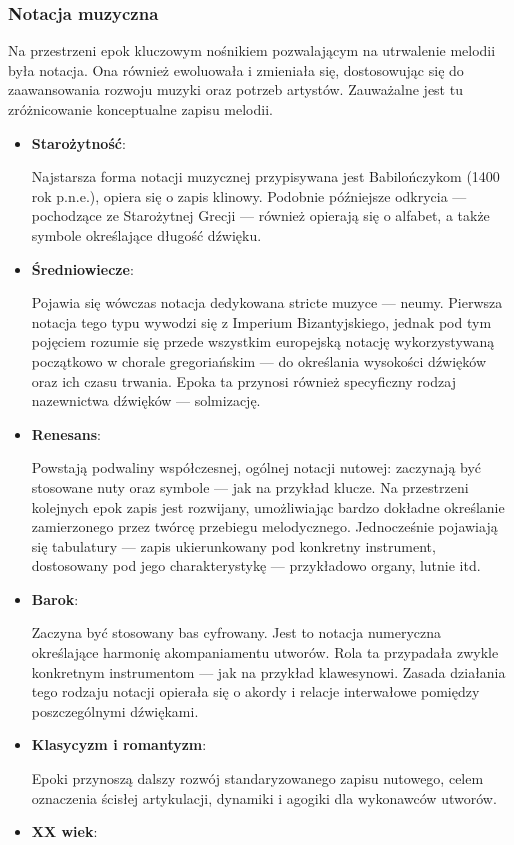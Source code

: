 \documentclass[12pt]{article}
\begin{document}
\subsubsection{Notacja muzyczna}
Na przestrzeni epok kluczowym nośnikiem pozwalającym na utrwalenie melodii była notacja.
Ona również ewoluowała i zmieniała się, dostosowując się do zaawansowania rozwoju muzyki oraz potrzeb artystów.
Zauważalne jest tu zróżnicowanie konceptualne zapisu melodii.
\begin{itemize}
	\item \textbf{Starożytność}:
	      
	      Najstarsza forma notacji muzycznej przypisywana jest Babilończykom (1400 rok p.n.e.), opiera się o zapis klinowy.
	      Podobnie późniejsze odkrycia — pochodzące ze Starożytnej Grecji — również opierają się o alfabet,
	      a także symbole określające długość dźwięku.
	\item \textbf{Średniowiecze}:
	      
	      Pojawia się wówczas notacja dedykowana stricte muzyce — neumy. Pierwsza notacja tego typu wywodzi się z Imperium Bizantyjskiego,
	      jednak pod tym pojęciem rozumie się przede wszystkim europejską notację wykorzystywaną początkowo w chorale
	      gregoriańskim — do określania wysokości dźwięków oraz ich czasu trwania.
	      Epoka ta przynosi również specyficzny rodzaj nazewnictwa dźwięków — solmizację.
	\item \textbf{Renesans}:
	      
	      Powstają podwaliny współczesnej, ogólnej notacji nutowej: zaczynają być stosowane nuty oraz symbole
	      — jak na przykład klucze.
	      Na przestrzeni kolejnych epok zapis jest rozwijany, umożliwiając bardzo dokładne określanie zamierzonego przez twórcę przebiegu
	      melodycznego.
	      Jednocześnie pojawiają się tabulatury — zapis ukierunkowany pod konkretny instrument, dostosowany pod jego charakterystykę —
	      przykładowo organy, lutnie itd.
	\item \textbf{Barok}:
	      
	      Zaczyna być stosowany bas cyfrowany.
	      Jest to notacja numeryczna określające harmonię akompaniamentu utworów.
	      Rola ta przypadała zwykle konkretnym instrumentom — jak na przykład klawesynowi.
	      Zasada działania tego rodzaju notacji opierała się o akordy i relacje interwałowe pomiędzy poszczególnymi dźwiękami.
	\item \textbf{Klasycyzm i romantyzm}:
	      
	      Epoki przynoszą dalszy rozwój standaryzowanego zapisu nutowego, celem oznaczenia ścisłej artykulacji, dynamiki i agogiki
	      dla wykonawców utworów.
	\item \textbf{XX wiek}:
	      

\end{itemize}
\end{document}
